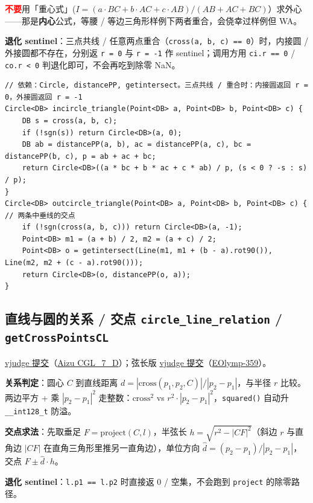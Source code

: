 		\textcolor{red}{\textbf{不要}}用「重心式」($I = (a \cdot BC + b \cdot AC + c \cdot AB)/(AB+AC+BC)$）求外心——那是\textbf{内心}公式，等腰 / 等边三角形样例下两者重合，会侥幸过样例但 WA。

		\textbf{退化 sentinel}：三点共线 / 任意两点重合（\texttt{cross(a, b, c) == 0}）时，内接圆 / 外接圆都不存在，分别返 \texttt{r = 0} 与 \texttt{r = -1} 作 sentinel；调用方用 \texttt{ci.r == 0} / \texttt{co.r < 0} 判退化即可，不会再吃到除零 NaN。

\begin{verbatim}
// 依赖：Circle, distancePP, getintersect。三点共线 / 重合时：内接圆返回 r = 0，外接圆返回 r = -1
Circle<DB> incircle_triangle(Point<DB> a, Point<DB> b, Point<DB> c) {
	DB s = cross(a, b, c);
	if (!sgn(s)) return Circle<DB>(a, 0);
	DB ab = distancePP(a, b), ac = distancePP(a, c), bc = distancePP(b, c), p = ab + ac + bc;
	return Circle<DB>((a * bc + b * ac + c * ab) / p, (s < 0 ? -s : s) / p);
}
Circle<DB> outcircle_triangle(Point<DB> a, Point<DB> b, Point<DB> c) { // 两条中垂线的交点
	if (!sgn(cross(a, b, c))) return Circle<DB>(a, -1);
	Point<DB> m1 = (a + b) / 2, m2 = (a + c) / 2;
	Point<DB> o = getintersect(Line(m1, m1 + (b - a).rot90()), Line(m2, m2 + (c - a).rot90()));
	return Circle<DB>(o, distancePP(o, a));
}
\end{verbatim}

		\subsection{直线与圆的关系 / 交点 \texttt{circle\_line\_relation} / \texttt{getCrossPointsCL}}

		\href{https://vjudge.net/solution/69928470}{vjudge 提交}（\href{https://vjudge.net/problem/Aizu-CGL_7_D}{Aizu CGL\_7\_D}）；弦长版 \href{https://vjudge.net/solution/69929454}{vjudge 提交}（\href{https://vjudge.net/problem/EOlymp-359}{EOlymp-359}）。

		\textbf{关系判定}：圆心 $C$ 到直线距离 $d = |\mathrm{cross}(p_1, p_2, C)| / |p_2 - p_1|$，与半径 $r$ 比较。两边平方 + 乘 $|p_2 - p_1|^2$ 走整数：$\mathrm{cross}^2$ vs $r^2 \cdot |p_2 - p_1|^2$，\texttt{squared()} 自动升 \texttt{\_\_int128\_t} 防溢。

		\textbf{交点求法}：先取垂足 $F = \mathrm{project}(C, l)$，半弦长 $h = \sqrt{r^2 - |CF|^2}$（斜边 $r$ 与直角边 $|CF|$ 在直角三角形里推另一直角边），单位方向 $\hat{d} = (p_2 - p_1) / |p_2 - p_1|$，交点 $F \pm \hat{d} \cdot h$。

		\textbf{退化 sentinel}：\texttt{l.p1 == l.p2} 时直接返 0 / 空集，不会跑到 \texttt{project} 的除零路径。

